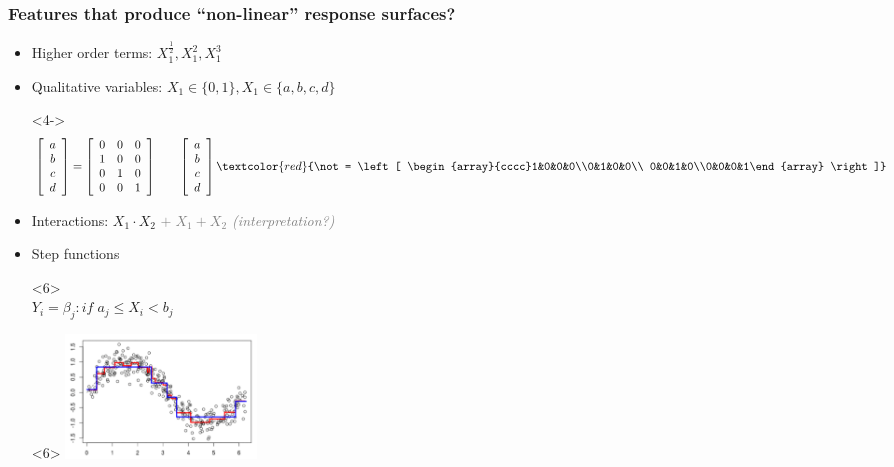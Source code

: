 \documentclass[xcolor={dvipsnames}]{beamer}
\begin{document}
\frame
{
 \frametitle{Features that produce ``non-linear'' response surfaces?}
 
\begin{itemize}
\item<2-> Higher order terms: $X_1^{\frac{1}{2}},X_1^2, X_1^3$
\item<3-> Qualitative variables: $X_1 \in \{0,1\}, X_1 \in \{a,b,c,d\}$
\vspace{-.1in}
\item[]<4-> $$ \left[ \begin{array}{c}a\\b\\c\\d\end{array} \right] = \left[ \begin{array}{ccc}0&0&0\\1&0&0\\0&1&0\\0&0&1\end{array} \right] \quad\quad \left[ \begin{array}{c}a\\b\\c\\d\end{array} \right] \textcolor{red}{\not = \left[ \begin{array}{cccc}1&0&0&0\\0&1&0&0\\
0&0&1&0\\0&0&0&1\end{array} \right]} $$


\item<5-> Interactions: $X_1\cdot X_2$ \textcolor{gray}{\emph{$ + \; X_1 + X_2$ (interpretation?)}}
\item<6-> Step functions
\item[]<6> ${}$\\$Y_i = \beta_j : if \; a_j \leq X_i < b_j$
\item[]<6> 
\vspace{-.7in}
\hspace*{2in}\includegraphics[width=2in]{stuff/step.png} 


\end{itemize}}
\end{document}
